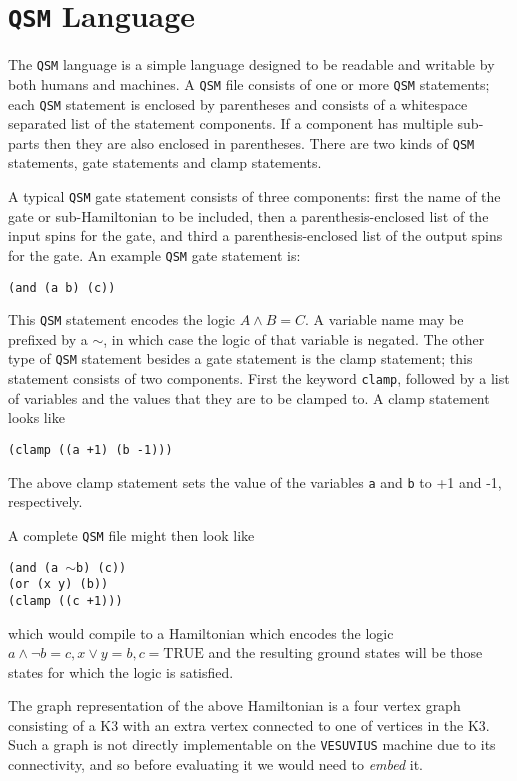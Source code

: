 \section{\texttt{QSM} Language}
The \texttt{QSM} language is a simple language designed to be readable and writable by both humans and machines.  A \texttt{QSM} file consists of one or more \texttt{QSM} statements; each \texttt{QSM} statement is enclosed by parentheses and consists of a whitespace separated list of the statement components.  If a component has multiple sub-parts then they are also enclosed in parentheses.  There are two kinds of \texttt{QSM} statements, gate statements and clamp statements.

A typical \texttt{QSM} gate statement consists of three components: first the name of the gate or sub-Hamiltonian to be included, then a parenthesis-enclosed list of the input spins for the gate, and third a parenthesis-enclosed list of the output spins for the gate.  An example \texttt{QSM} gate statement is: 
\begin{center}
	\texttt{(and (a b) (c))}
\end{center}
This \texttt{QSM} statement encodes the logic $A \wedge B = C$.  A variable name may be prefixed by a $\sim$, in which case the logic of that variable is negated.  The other type of \texttt{QSM} statement besides a gate statement is the clamp statement; this statement consists of two components.  First the keyword \texttt{clamp}, followed by a list of variables and the values that they are to be clamped to.  A clamp statement looks like
\begin{center}
	\texttt{(clamp ((a +1) (b -1)))}
\end{center}
The above clamp statement sets the value of the variables \texttt{a} and \texttt{b} to +1 and -1, respectively.

A complete \texttt{QSM} file might then look like

\begin{center}
	\texttt{(and (a $\sim$b) (c))}\\
	\texttt{(or (x y) (b))}\\
	\texttt{(clamp ((c +1)))}
\end{center}
which would compile to a Hamiltonian which encodes the logic $a \wedge \neg b = c, x \vee y = b, c = \text{TRUE}$ and the resulting ground states will be those states for which the logic is satisfied.

The graph representation of the above Hamiltonian is a four vertex graph consisting of a K3 with an extra vertex connected to one of vertices in the K3.  Such a graph is not directly implementable on the \texttt{VESUVIUS} machine due to its connectivity, and so before evaluating it we would need to \emph{embed} it.

